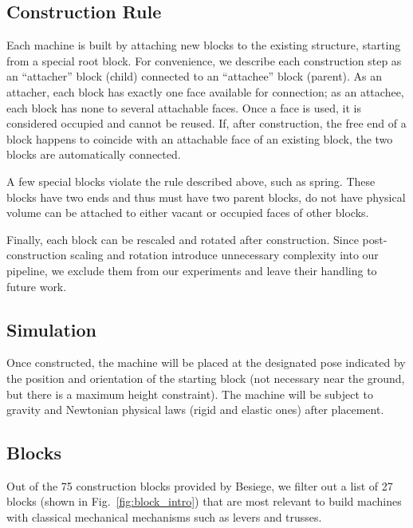 \subsection{Construction Rule}

Each machine is built by attaching new blocks to the existing structure, starting from a special root block. For convenience, we describe each construction step as an “attacher” block (child) connected to an “attachee” block (parent). As an attacher, each block has exactly one face available for connection; as an attachee, each block has none to several attachable faces. Once a face is used, it is considered occupied and cannot be reused. If, after construction, the free end of a block happens to coincide with an attachable face of an existing block, the two blocks are automatically connected.

A few special blocks violate the rule described above, such as spring. These blocks have two ends and thus must have two parent blocks, do not have physical volume can be attached to either vacant or occupied faces of other blocks.

Finally, each block can be rescaled and rotated after construction. Since post-construction scaling and rotation introduce unnecessary complexity into our pipeline, we exclude them from our experiments and leave their handling to future work.

\subsection{Simulation}

Once constructed, the machine will be placed at the designated pose indicated by the position and orientation of the starting block (not necessary near the ground, but there is a maximum height constraint). The machine will be subject to gravity and Newtonian physical laws (rigid and elastic ones) after placement.

\subsection{Blocks}\label{sec:b.1}
Out of the 75 construction blocks provided by Besiege, we filter out a list of 27 blocks (shown in Fig.~\ref{fig:block_intro}) that are most relevant to build machines with classical mechanical mechanisms such as levers and trusses.


